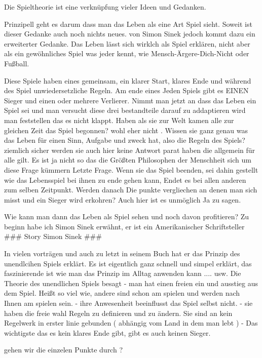 
Die Spieltheorie ist eine verknüpfung vieler Ideen und Gedanken. 

Prinzipell geht es darum dass man das Leben als eine Art Spiel sieht. 
Soweit ist dieser Gedanke auch noch nichts neues. von Simon Sinek jedoch kommt dazu ein erweiterter Gedanke. 
Das Leben lässt sich wirklch als Spiel erklären, nicht aber als ein gewöhnliches Spiel was jeder kennt, wie Mensch-Ärgere-Dich-Nicht oder Fußball. 

Diese Spiele haben eines gemeinsam, ein klarer Start, klares Ende und während des Spiel unwiedersetzliche Regeln. Am ende eines Jeden Spiels gibt es EINEN Sieger und einen oder mehrere Verlierer.
Nimmt man jetzt an dass das Leben ein Spiel sei und man versucht diese drei bestandteile darauf zu addaptieren wird man feststellen das es nicht klappt. 
    Haben als sie zur Welt kamen alle zur gleichen Zeit das Spiel begonnen? wohl eher nicht .
    Wissen sie ganz genau was das Leben für einen Sinn, Aufgabe und zweck hat, also die Regeln des Spiels? ziemlich sicher werden sie auch hier keine Antwort parat haben die allgemein für alle gilt. Es ist ja nicht so das die Größten Philosophen der Menschheit sich um diese Frage kümmern 
    Letzte Frage. Wenn sie das Spiel beenden, sei dahin gestellt wie das Lebensspiel bei ihnen zu ende gehen kann, Endet es bei allen anderen zum selben Zeitpunkt. Werden danach Die punkte vergliechen an denen man sich misst und ein Sieger wird erkohren? Auch hier ist es unmöglich Ja zu sagen.

Wie kann man dann das Leben als Spiel sehen und noch davon profitieren? 
Zu beginn habe ich Simon Sinek erwähnt, er ist ein Amerikanischer Schriftsteller
###
 Story Simon Sinek
###

In vielen vorträgen und auch zu letzt in seinem Buch hat er das Prinzip des unendlcihen Spiels erklärt. 
Es ist eigentlich ganz schnell und simpel erklärt, das faszinierende ist wie man das Prinzip im Alltag anwenden kann .... usw.
Die Theorie des unendlichen Spiels besagt 
    - man hat einen freien ein und ausstieg aus dem Spiel. Heißt so viel wie, andere sind schon am spielen und werden nach Ihnen am spielen sein.
    - ihre Anwesenheit beeinflusst das Spiel selbst nicht. 
    - sie haben die freie wahl Regeln zu definieren und zu ändern. Sie sind an kein Regelwerk in erster linie gebunden ( abhängig vom Land in dem man lebt )
    - Das wichtigste das es kein klares Ende gibt, gibt es auch keinen Sieger. 

gehen wir die einzelen Punkte durch ? 

